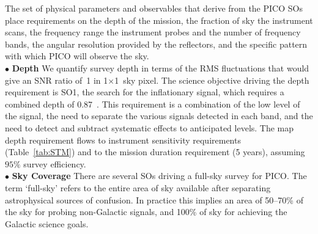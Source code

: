 \documentclass[PICOReport.tex]{subfiles}
\begin{document}
The set of physical parameters and observables that derive from the PICO \ac{SOs} place 
requirements on the depth of the mission, the fraction of sky the instrument scans, the frequency range the 
instrument probes and the number of frequency bands, the angular resolution provided by the reflectors, and
the specific pattern with which PICO will observe the sky.  \\
%
$\bullet$ {\bf Depth} \hspace{0.1in} We quantify survey depth in terms of the RMS fluctuations that would give
an \ac{SNR} ratio of~1 in 1\arcmin$\times$1\arcmin\ sky pixel.  The science objective driving 
the depth requirement is SO1, the search for the inflationary signal, which 
requires a combined depth of 0.87~\microkamin. This requirement is a combination of the low level of the signal, the need
to separate the various signals detected in each band, and the need to detect and subtract systematic effects 
to anticipated levels.  The map depth requirement flows to instrument sensitivity requirements (Table~\ref{tab:STM}) and to the mission duration requirement (5 years), assuming $95\%$ survey efficiency. \\
%
$\bullet$ {\bf Sky Coverage} \hspace{0.1in} There are several \ac{SOs} driving a full-sky survey for PICO. The term `full-sky' refers to the entire area of sky available after separating astrophysical sources of confusion. In practice this implies an area of 50--70\% of the sky for probing non-Galactic signals, and 100\% of sky for achieving the Galactic science goals. 
\end{document}
